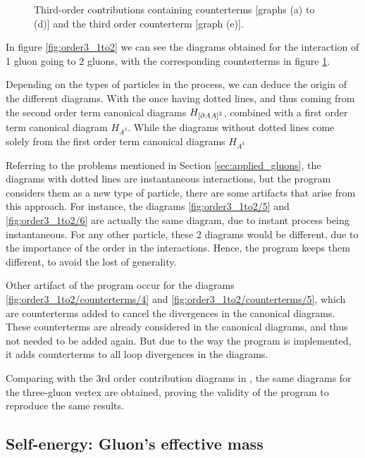 \documentclass[11pt,a4paper,twoside,pdf]{article}
\numberwithin{equation}{section}
\begin{document}
\begin{figure}[h!]
\begin{subfigure}[t]{0.24\textwidth}
        \caption{ }
    \end{subfigure}%
    \caption{Third-order contributions containing counterterms [graphs (a) to (d)] and the third order
    counterterm [graph (e)].}
    \label{fig:order3_1to2/counterterms}
\end{figure}


In figure \ref{fig:order3_1to2} we can see the diagrams obtained for the interaction
of 1 gluon going to 2 gluons, with the corresponding counterterms in figure
\ref{fig:order3_1to2/counterterms}. 

Depending on the types of particles in the process, we can deduce the origin of the 
different diagrams. With the once having dotted lines, and thus coming from the second
order term canonical diagrams $H_{\left[ \partial A A \right]^2}$, combined with a first 
order term canonical diagram $H_{A^3}$. While the diagrams without dotted lines
come solely from the first order term canonical diagrams $H_{A^3}$

Referring to the problems mentioned in Section \ref{sec:applied_gluons}, the diagrams 
with dotted lines are instantaneous interactions, but the program considers them
as a new type of particle, there are some artifacts that arise from this
approach. For instance, the diagrams \ref{fig:order3_1to2/5} and \ref{fig:order3_1to2/6} are actually the same 
diagram, due to instant process being instantaneous. For any other particle, these 
2 diagrams would be different, due to the importance of the order in the interactions.
Hence, the program keeps them different, to avoid the lost of generality.

Other artifact of the program occur for the diagrams \ref{fig:order3_1to2/counterterms/4} and
\ref{fig:order3_1to2/counterterms/5}, which are counterterms added to cancel the divergences
in the canonical diagrams. These counterterms are already considered in the canonical diagrams, 
and thus not needed to be added again. But due to the way the program is implemented,
it adds counterterms to all loop divergences in the diagrams.

Comparing with the 3rd order contribution diagrams in \cite{QCDG}, the same diagrams
for the three-gluon vertex are obtained, proving the validity of the program to reproduce the same results.

\subsection{Self-energy: Gluon's effective mass}
\end{document}
